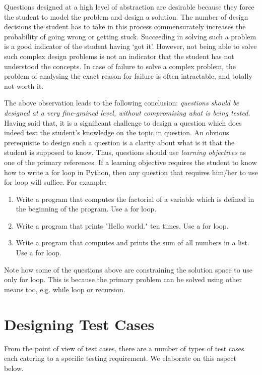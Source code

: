\documentclass[sigconf]{acmart}
\begin{document}
Questions designed at a high level of abstraction are desirable because they force the student to model the problem and design a solution. The number of design decisions the student has to take in this process commensurately increases the probability of going wrong or getting stuck. Succeeding in solving such a problem is a good indicator of the student having `got it'. However, not being able to solve such complex design problems is not an indicator that the student has not understood the concepts. In case of failure to solve a complex problem, the problem of analysing the exact reason for failure is often intractable, and totally not worth it.

The above observation leads to the following conclusion: \emph{questions should be designed at a very fine-grained level, without compromising what is being tested.} Having said that, it is a significant challenge to design a question which does indeed test the student's knowledge on the topic in question. An obvious prerequisite to design such a question is a clarity about what is it that the student is supposed to know. Thus, questions should use \textit{learning objectives} as one of the primary references. If a learning objective requires the student to know how to write a for loop in Python, then any question that requires him/her to use for loop will suffice. For example:
\begin{enumerate}
\item Write a program that computes the factorial of a variable \lstinline@x@ which is defined in the beginning of the program. Use a for loop.
\item Write a program that prints "Hello world." ten times. Use a for loop.
\item Write a program that computes and prints the sum of all numbers in a list. Use a for loop.
\end{enumerate}

Note how some of the questions above are constraining the solution space to use only for loop. This is because the primary problem can be solved using other means too, e.g. while loop or recursion.

\section{Designing Test Cases}
From the point of view of test cases, there are a number of types of test cases each catering to a specific testing requirement. We elaborate on this aspect below.
\end{document}
